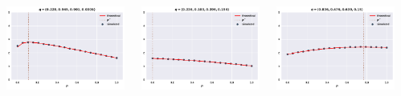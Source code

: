 \documentclass[usenames,dvipsnames,t]{beamer}
\begin{document}
\begin{columns}
    \begin{column}{.03\linewidth}
    \end{column}
    \begin{column}{.2\linewidth}
        \vspace{1cm}
        \includegraphics[width=.8\textwidth]{static/plot_one}
    \end{column}
    \begin{column}{.2\linewidth}
        \includegraphics[width=.8\textwidth]{static/plot_two}
    \end{column}
    \begin{column}{.2\linewidth}
        \includegraphics[width=.8\textwidth]{static/plot_three}

\end{column}
\end{columns}
\end{document}
